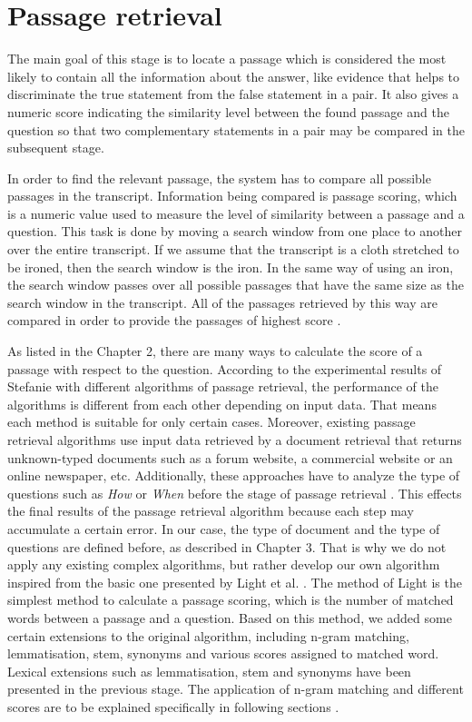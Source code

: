 \section{Passage retrieval} 


The main goal of this stage is to locate a passage which is considered the most likely to contain all the information about the answer, like evidence that helps to discriminate the true statement from the false statement in a pair. It also gives a numeric score indicating the similarity level between the found passage and the question so that two complementary statements in a pair may be compared in the subsequent stage.

In order to find the relevant passage, the system has to compare all possible passages in the transcript. Information being compared is passage scoring, which is a numeric value used to measure the level of similarity between a passage and a question. This task is done by moving a search window from one place to another over the entire transcript. If we assume that the transcript is a cloth stretched to be ironed, then the search window is the iron. In the same way of using an iron, the search window passes over all possible passages that have the same size as the search window in the transcript. All of the passages retrieved by this way are compared in order to provide the passages of highest score \cite{lequocanh, lequocanh1}. 

As listed in the Chapter 2, there are many ways to calculate the score of a passage with respect to the question. According to the experimental results of Stefanie \cite{tellex2003qep} with different algorithms of passage retrieval, the performance of the algorithms is different from each other depending on input data. That means each method is suitable for only certain cases. Moreover, existing passage retrieval algorithms use input data retrieved by a document retrieval that returns unknown-typed documents such as a forum website, a commercial website or an online newspaper, etc. Additionally, these approaches have to analyze the type of questions such as \textit{How} or \textit{When} before the stage of passage retrieval  \cite{TREC8, TREC2001, hirschman2002nlq, tellex2003qep}. This effects the final results of the passage retrieval algorithm because each step may accumulate a certain error. In our case, the type of document and the type of questions are defined before, as described in Chapter 3. That is why we do not apply any existing complex algorithms, but rather develop our own algorithm inspired from the basic one presented by Light et al. \cite{light2002aec}. The method of Light is the simplest method to calculate a passage scoring, which is the number of matched words between a passage and a question. Based on this method, we added some certain extensions to the original algorithm, including n-gram matching, lemmatisation, stem, synonyms and various scores assigned to matched word. Lexical extensions such as lemmatisation, stem and synonyms have been presented in the previous stage. The application of n-gram matching and different scores are to be explained specifically in following sections \cite{lequocanh1}.

